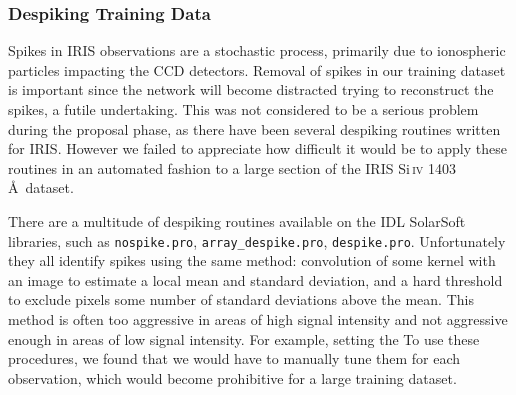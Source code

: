 \documentclass[10pt,letterpaper]{article}
\newcommand{\SiIV}{Si\,\textsc{iv} 1403 \AA}
\begin{document}
				
							
			\subsubsection{Despiking Training Data}	\label{sec_dspk}
			
				Spikes in IRIS observations are a stochastic process, primarily due to ionospheric particles impacting the CCD detectors.
				Removal of spikes in our training dataset is important since the network will become distracted trying to reconstruct the spikes, a futile undertaking.
				This was not considered to be a serious problem during the proposal phase, as there have been several despiking routines written for IRIS.
				However we failed to appreciate how difficult it would be to apply these routines in an automated fashion to a large section of the IRIS \SiIV\ dataset.
				
				There are a multitude of despiking routines available on the IDL SolarSoft libraries, such as \texttt{nospike.pro}, \texttt{array\_despike.pro}, \texttt{despike.pro}.
				Unfortunately they all identify spikes using the same method: convolution of some kernel with an image to estimate a local mean and standard deviation, and a hard threshold to exclude pixels some number of standard deviations above the mean.
				This method is often too aggressive in areas of high signal intensity and not aggressive enough in areas of low signal intensity.
				For example, setting the 
				To use these procedures, we found that we would have to manually tune them for each observation, which would become prohibitive for a large training dataset.
				
				
			
\end{document}
